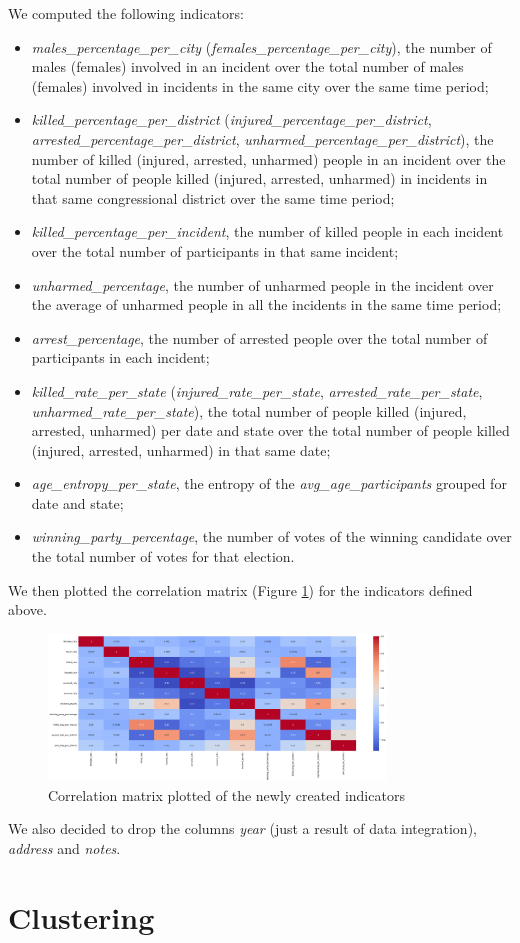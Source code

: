 \documentclass[10pt,a4paper]{report}
\begin{document}
We computed the following indicators:
\begin{itemize}
	\item \textit{males\_percentage\_per\_city} (\textit{females\_percentage\_per\_city}), the number of males (females) involved in an incident over the total number of males (females) involved in incidents in the same city over the same time period;
	\item \textit{killed\_percentage\_per\_district} (\textit{injured\_percentage\_per\_district}, \textit{arrested\_percentage\_per\_district}, \textit{unhar\-med\_percentage\_per\_district}), the number of killed (injured, arrested, unharmed) people in an incident over the total number of people killed (injured, arrested, unharmed) in incidents in that same congressional district over the same time period;
	\item \textit{killed\_percentage\_per\_incident}, the number of killed people in each incident over the total number of participants in that same incident;
	\item \textit{unharmed\_percentage}, the number of unharmed people in the incident over the average of unharmed people in all the incidents in the same time period;
	\item \textit{arrest\_percentage}, the number of arrested people over the total number of participants in each incident;
	\item \textit{killed\_rate\_per\_state} (\textit{injured\_rate\_per\_state}, \textit{arrested\_rate\_per\_state}, \textit{unharmed\_rate\_per\_state}), the total number of people killed (injured, arrested, unharmed) per date and state over the total number of people killed (injured, arrested, unharmed) in that same date;
	\item \textit{age\_entropy\_per\_state}, the entropy of the \textit{avg\_age\_participants} grouped for date and state;
	\item \textit{winning\_party\_percentage}, the number of votes of the winning candidate over the total number of votes for that election.
\end{itemize}

We then plotted the correlation matrix (Figure \ref{corr_matrix_indicators}) for the indicators defined above.

\begin{figure}[h]
	\includegraphics[width=0.8\textwidth]{corr_matrix_indicators}
	\centering
	\caption{Correlation matrix plotted of the newly created indicators}
	\label{corr_matrix_indicators}
\end{figure}

We also decided to drop the columns \textit{year} (just a result of data integration), \textit{address} and \textit{notes}.

\chapter{Clustering}
\end{document}
